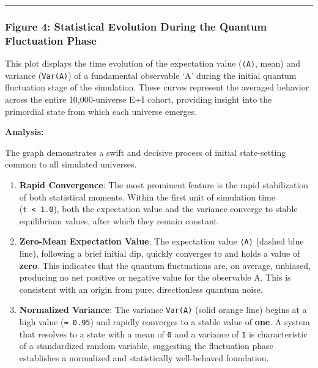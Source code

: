 \begin{center}\rule{0.5\linewidth}{0.5pt}\end{center}

\subsubsection{Figure 4: Statistical Evolution During the Quantum
Fluctuation
Phase}\label{figure-4-statistical-evolution-during-the-quantum-fluctuation-phase}

This plot displays the time evolution of the expectation value
(\texttt{⟨A⟩}, mean) and variance (\texttt{Var(A)}) of a fundamental
observable `A' during the initial quantum fluctuation stage of the
simulation. These curves represent the averaged behavior across the
entire 10,000-universe E+I cohort, providing insight into the primordial
state from which each universe emerges.

\textbf{Analysis:}

The graph demonstrates a swift and decisive process of initial
state-setting common to all simulated universes.

\begin{enumerate}
\def\labelenumi{\arabic{enumi}.}
\item
  \textbf{Rapid Convergence}: The most prominent feature is the rapid
  stabilization of both statistical moments. Within the first unit of
  simulation time (\texttt{t\ \textless{}\ 1.0}), both the expectation
  value and the variance converge to stable equilibrium values, after
  which they remain constant.
\item
  \textbf{Zero-Mean Expectation Value}: The expectation value
  \texttt{⟨A⟩} (dashed blue line), following a brief initial dip,
  quickly converges to and holds a value of \textbf{zero}. This
  indicates that the quantum fluctuations are, on average, unbiased,
  producing no net positive or negative value for the observable A. This
  is consistent with an origin from pure, directionless quantum noise.
\item
  \textbf{Normalized Variance}: The variance \texttt{Var(A)} (solid
  orange line) begins at a high value (\texttt{≈\ 0.95}) and rapidly
  converges to a stable value of \textbf{one}. A system that resolves to
  a state with a mean of \texttt{0} and a variance of \texttt{1} is
  characteristic of a standardized random variable, suggesting the
  fluctuation phase establishes a normalized and statistically
  well-behaved foundation.
\end{enumerate}

